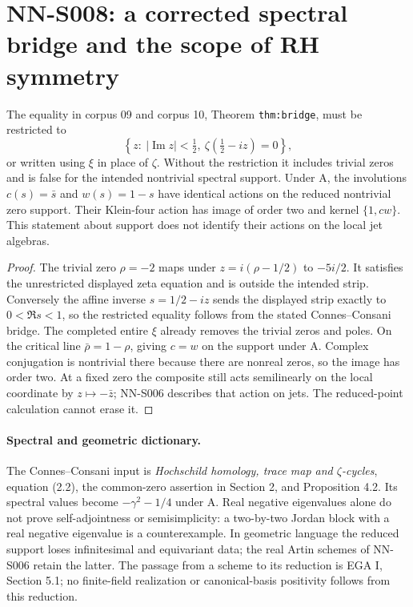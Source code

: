 \section{NN-S008: a corrected spectral bridge and the scope of RH symmetry}
\label{sec:NN-S008}

\begin{proposition}[NN-S008]
The equality in corpus 09 and corpus 10, Theorem
\texttt{thm:bridge}, must be restricted to
\[
 \left\{z:\ |\operatorname{Im}z|<\tfrac12,
               \ \zeta(\tfrac12-iz)=0\right\},
\]
or written using $\xi$ in place of $\zeta$. Without the restriction
it includes trivial zeros and is false for the intended nontrivial
spectral support. Under A, the involutions $c(s)=\bar s$ and
$w(s)=1-s$ have identical actions on the reduced nontrivial zero
support. Their Klein-four action has image of order two and kernel
$\{1,cw\}$. This statement about support does not identify their
actions on the local jet algebras.
\end{proposition}

\begin{proof}
The trivial zero $\rho=-2$ maps under $z=i(\rho-1/2)$ to
$-5i/2$. It satisfies the unrestricted displayed zeta equation
and is outside the intended strip. Conversely the affine inverse
$s=1/2-iz$ sends the displayed strip exactly to $0<\Re s<1$,
so the restricted equality follows from the stated Connes--Consani
bridge. The completed entire $\xi$ already removes the trivial
zeros and poles. On the critical line $\bar\rho=1-\rho$, giving
$c=w$ on the support under A. Complex conjugation is nontrivial
there because there are nonreal zeros, so the image has order two.
At a fixed zero the composite still acts semilinearly on the
local coordinate by $z\mapsto-\bar z$; NN-S006 describes that
action on jets. The reduced-point calculation cannot erase it.
\end{proof}

\paragraph{Spectral and geometric dictionary.}
The Connes--Consani input is \emph{Hochschild homology, trace map
and $\zeta$-cycles}, equation (2.2), the common-zero assertion in
Section 2, and Proposition 4.2. Its spectral values become
$-\gamma^2-1/4$ under A. Real negative eigenvalues alone do not
prove self-adjointness or semisimplicity: a two-by-two Jordan
block with a real negative eigenvalue is a counterexample.
In geometric language the reduced support loses infinitesimal
and equivariant data; the real Artin schemes of NN-S006 retain
the latter. The passage from a scheme to its reduction is EGA I,
Section 5.1; no finite-field realization or canonical-basis
positivity follows from this reduction.

